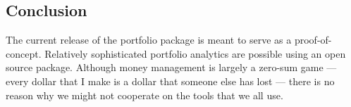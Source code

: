 \documentclass[a4paper]{report}
\begin{document}
\begin{article}
\section*{Conclusion}

The current release of the portfolio package is meant to serve as a
proof-of-concept. Relatively sophisticated portfolio analytics are
possible using an open source package. Although money management is
largely a zero-sum game --- every dollar that I make is a dollar that
someone else has lost --- there is no reason why we might not
cooperate on the tools that we all use.

\address{David Kane and Jeff Enos\\
 Kane Capital Management, Cambridge, Massachusetts, USA\\
  and  }
\end{article}
\end{document}
